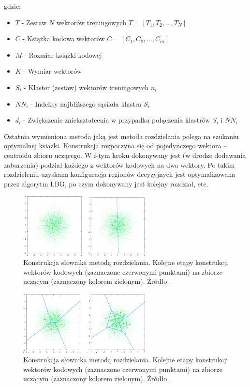 \documentclass{article}
\begin{document}
gdzie:
\begin{itemize}[label=]
  \item $T$ - Zestaw $N$ wektorów treningowych $T = {[T_{1}, T_{2}, \dots, T_{N}]}$
  \item $C$ - Książka kodowa wektorów $C = {[C_{1}, C_{2}, \dots, C_{m}]}$
  \item $M$ - Rozmiar książki kodowej
  \item $K$ - Wymiar wektorów
  \item $S_{i}$ - Klaster (zestaw) wektorów treningowych $n_{i}$
  \item $NN_{i}$ - Indeksy najbliższego sąsiada klastra $S_{i}$
  \item $d_{i}$ - Zwiększenie zniekształcenia w przypadku połączenia klastrów $S_{i}$ i $NN_{i}$
        \cite{tkaukoranta}
\end{itemize}

Ostatnia wymieniona metoda jaką jest metoda rozdzielania polega na szukaniu optymalnej książki.
Konstrukcja rozpoczyna się od pojedynczego wektora – centroidu zbioru uczącego.
W $i$-tym kroku dokonywany jest (w drodze dodawania zaburzenia) podział każdego z wektorów kodowych na dwa wektory.
Po takim rozdzieleniu uzyskana konfiguracja regionów decyzyjnych jest optymalizowana przez algorytm LBG, po czym dokonywany jest kolejny rozdział, etc.

\begin{figure}[H]
  \centering
  \includegraphics[width=0.6\textwidth]{images/rodzielania_1.png}
  \caption{Konstrukcja słownika metodą rozdzielania. Kolejne etapy konstrukcji wektorów kodowych
    (zaznaczone czerwonymi punktami) na zbiorze uczącym (zaznaczony kolorem zielonym). Źródło \cite{mwilczewski}.}
  \label{fig:rozdzielania_1}
\end{figure}

\begin{figure}[H]
  \centering
  \includegraphics[width=0.6\textwidth]{images/rodzielania_2.png}
  \caption{Konstrukcja słownika metodą rozdzielania. Kolejne etapy konstrukcji wektorów kodowych
    (zaznaczone czerwonymi punktami) na zbiorze uczącym (zaznaczony kolorem zielonym). Źródło \cite{mwilczewski}.}
  \label{fig:rozdzielania_2}
\end{figure}
\end{document}
